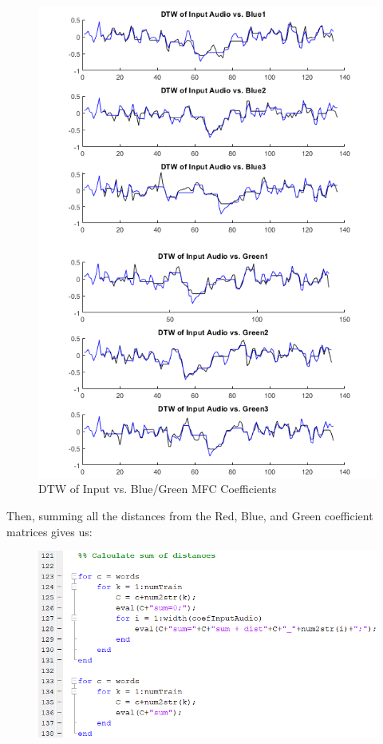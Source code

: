 \documentclass{article}
\begin{document}
\begin{figure}[H]
    \centering
    \includegraphics[width=\linewidth]{DTWMFCC_BG.png}
    \caption{DTW of Input vs. Blue/Green MFC Coefficients}
    \label{fig:MATLAB_dtwBG}
\end{figure}

Then, summing all the distances from the Red, Blue, and Green coefficient matrices gives us:

\begin{figure}[H]
    \centering
    \includegraphics[width=\linewidth]{MATLAB_sumofdist.png}
    \caption{}
    \label{fig:MATLAB_sumofdist}
\end{figure}
\end{document}
